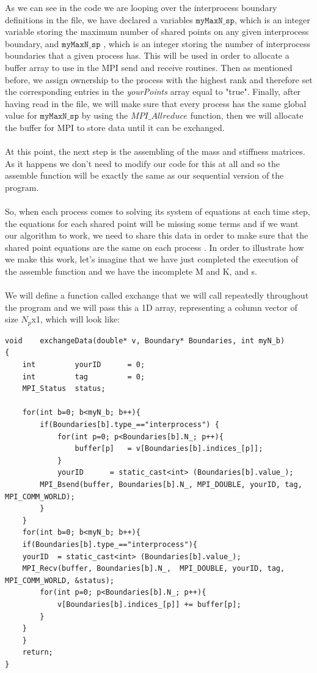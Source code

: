 \documentclass[12pt]{article}
\begin{document}
As we can see in the code we are looping over the interprocess boundary definitions in the file, we have declared
a variables $\texttt{myMaxN\_sp}$, which is an integer variable storing the maximum number of shared points on any given interprocess boundary, and $\texttt{myMaxN\_sp}$ , which is an integer storing the number of interprocess boundaries that a given process has. This will be used in order to allocate a buffer array to use in the MPI send and receive routines. Then as mentioned before, we assign ownership to the process with the highest rank and therefore set the corresponding entries in the \textit{yourPoints} array equal to "true". Finally, after having read in the file, we will make sure that every process has the same global value for $\texttt{myMaxN\_sp}$ by using the $MPI\_Allreduce$ function, then we will allocate the buffer for MPI to store data until it can be exchanged.
\\\\
At this point, the next step is the assembling of the mass and stiffness matrices. As it happens we don't need to modify our code for this at all and so the assemble function will be exactly the same as our sequential version of the program.
\\\\
So, when each process comes to solving its system of equations at each time step, the equations for each shared point will be missing some terms and if we want our algorithm to work, we need to share this data in order to make sure that the shared point equations are the same on each process \cite{Steve13}. In order to illustrate how we make this work, let's imagine that we have just completed the execution of the assemble function and we have the incomplete M and K, and s.
\\\\
We will define a function called exchange that we will call repeatedly throughout the program and we will pass this a 1D
array, representing a column vector of size $N_p$x1, which will look like:

\begin{lstlisting}[style=MyC++Style] 
void	exchangeData(double* v, Boundary* Boundaries, int myN_b)
{
	int			yourID		= 0;
	int			tag			= 0;
	MPI_Status	status;

	for(int b=0; b<myN_b; b++){
		if(Boundaries[b].type_=="interprocess")	{
			for(int p=0; p<Boundaries[b].N_; p++){
				buffer[p]	= v[Boundaries[b].indices_[p]];
			}
			yourID		= static_cast<int> (Boundaries[b].value_);
		MPI_Bsend(buffer, Boundaries[b].N_,	MPI_DOUBLE,	yourID,	tag, MPI_COMM_WORLD);
		}
	}
	for(int b=0; b<myN_b; b++){
	if(Boundaries[b].type_=="interprocess"){
	yourID	= static_cast<int> (Boundaries[b].value_);
	MPI_Recv(buffer, Boundaries[b].N_,	MPI_DOUBLE,	yourID,	tag, MPI_COMM_WORLD, &status);
		for(int p=0; p<Boundaries[b].N_; p++){
			v[Boundaries[b].indices_[p]] += buffer[p];
		}
	}
	}
	return;
}
\end{lstlisting}
\end{document}
